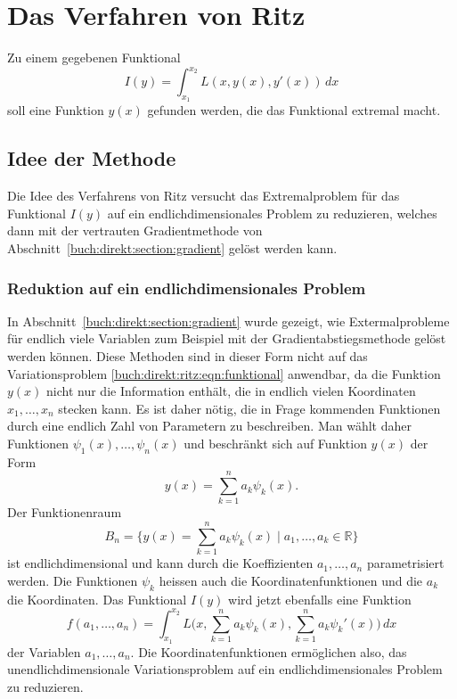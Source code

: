 %
%
%
\section{Das Verfahren von Ritz
\label{buch:direkt:section:ritz}}
Zu einem gegebenen Funktional
\begin{equation}
I(y)
=
\int_{x_1}^{x_2}
L(x,y(x),y'(x))
\,dx
\label{buch:direkt:ritz:eqn:funktional}
\end{equation}
soll eine Funktion $y(x)$ gefunden werden, die das Funktional
extremal macht.

%
%
\subsection{Idee der Methode}
Die Idee des Verfahrens von Ritz
%
%
versucht das Extremalproblem für das Funktional $I(y)$ auf ein
endlichdimensionales Problem zu reduzieren, welches dann mit der
vertrauten Gradientmethode von
Abschnitt~\ref{buch:direkt:section:gradient} gelöst werden kann.

%
%
\subsubsection{Reduktion auf ein endlichdimensionales Problem}
In Abschnitt~\ref{buch:direkt:section:gradient} wurde gezeigt, wie 
Extermalprobleme für endlich viele Variablen zum Beispiel mit der
Gradientabstiegsmethode gelöst werden können.
Diese Methoden sind in dieser Form nicht auf das Variationsproblem
\eqref{buch:direkt:ritz:eqn:funktional} anwendbar, da die Funktion
$y(x)$ nicht nur die Information enthält, die in endlich vielen
Koordinaten $x_1,\dots,x_n$ stecken kann.
Es ist daher nötig, die in Frage kommenden Funktionen durch eine
endlich Zahl von Parametern zu beschreiben.
Man wählt daher Funktionen $\psi_1(x),\dots,\psi_n(x)$ und beschränkt
sich auf Funktion $y(x)$ der Form
\[
y(x)
=
\sum_{k=1}^n
a_k \psi_k(x).
\]
Der Funktionenraum 
\[
B_n
=
\biggl\{
y(x)
=
\sum_{k=1}^n a_k\psi_k(x)
\;
\bigg|
\;
a_1,\dots,a_k\in\mathbb{R}
\biggr\}
\]
ist endlichdimensional und kann durch die Koeffizienten $a_1,\dots,a_n$
parametrisiert werden.
Die Funktionen $\psi_k$ heissen auch die Koordinatenfunktionen und die
$a_k$ die Koordinaten.
Das Funktional $I(y)$ wird jetzt ebenfalls eine Funktion
\[
f(a_1,\dots,a_n)
=
\int_{x_1}^{x_2}
L\biggl(x,
\sum_{k=1}^n a_k\psi_k(x),
\sum_{k=1}^n a_k\psi_k'(x)
\biggr)
\,dx
\]
der Variablen $a_1,\dots,a_n$.
Die Koordinatenfunktionen ermöglichen also, das unendlichdimensionale
Variationsproblem auf ein endlichdimensionales Problem zu reduzieren.


